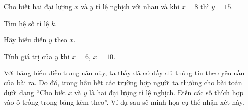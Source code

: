 \begin{vd}%
 Cho biết hai đại lượng $x$ và $y$ tỉ lệ nghịch với nhau và khi $x=8$ thì $y=15$.
 \begin{enumEX}{2}
  \item Tìm hệ số tỉ lệ $k$.
  \item Hãy biểu diễn $y$ theo $x$.
  \item Tính giá trị của $y$ khi $x=6$, $x=10$.
 \end{enumEX}
 \loigiai
  {
  \begin{note}
   Với bảng biểu diễn trong câu này, ta thấy đã có đầy đủ thông tin theo yêu cầu của bài ra. Do đó, trong hầu hết các trường hợp người ta thường cho bài toán dưới dạng ``Cho biết $x$ và $y$ là hai đại lượng tỉ lệ nghịch. Điền các số thích hợp vào ô trống trong bảng kèm theo''. Ví dụ sau sẽ minh họa cụ thể nhận xét này.
  \end{note}
  }
\end{vd}

